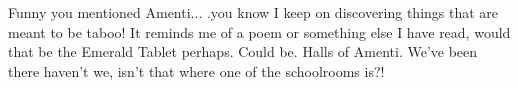 \begin{footnotesize}
\begin{sffamily}
Funny you mentioned Amenti... .you know I keep on discovering things that are meant to be taboo! It reminds me of a poem or something else I have read, would that be the Emerald Tablet perhaps. Could be. Halls of Amenti. We've been there haven't we, isn't that where one of the schoolrooms is?!

\hfill

\end{sffamily}
\end{footnotesize}

